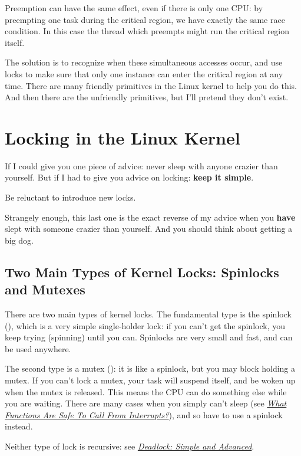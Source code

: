 \documentclass[a4paper,8pt,english]{sphinxmanual}
\begin{document}
Preemption can have the same effect, even if there is only one CPU: by
preempting one task during the critical region, we have exactly the same
race condition. In this case the thread which preempts might run the
critical region itself.

The solution is to recognize when these simultaneous accesses occur, and
use locks to make sure that only one instance can enter the critical
region at any time. There are many friendly primitives in the Linux
kernel to help you do this. And then there are the unfriendly
primitives, but I'll pretend they don't exist.


\section{Locking in the Linux Kernel}
\label{kernel-hacking/locking:locking-in-the-linux-kernel}
If I could give you one piece of advice: never sleep with anyone crazier
than yourself. But if I had to give you advice on locking: \textbf{keep it
simple}.

Be reluctant to introduce new locks.

Strangely enough, this last one is the exact reverse of my advice when
you \textbf{have} slept with someone crazier than yourself. And you should
think about getting a big dog.


\subsection{Two Main Types of Kernel Locks: Spinlocks and Mutexes}
\label{kernel-hacking/locking:two-main-types-of-kernel-locks-spinlocks-and-mutexes}
There are two main types of kernel locks. The fundamental type is the
spinlock (), which is a very simple
single-holder lock: if you can't get the spinlock, you keep trying
(spinning) until you can. Spinlocks are very small and fast, and can be
used anywhere.

The second type is a mutex (): it is like a
spinlock, but you may block holding a mutex. If you can't lock a mutex,
your task will suspend itself, and be woken up when the mutex is
released. This means the CPU can do something else while you are
waiting. There are many cases when you simply can't sleep (see
{\hyperref[kernel\string-hacking/locking:sleeping\string-things]{\emph{What Functions Are Safe To Call From Interrupts?}}}),
and so have to use a spinlock instead.

Neither type of lock is recursive: see
{\hyperref[kernel\string-hacking/locking:deadlock]{\emph{Deadlock: Simple and Advanced}}}.
\end{document}
